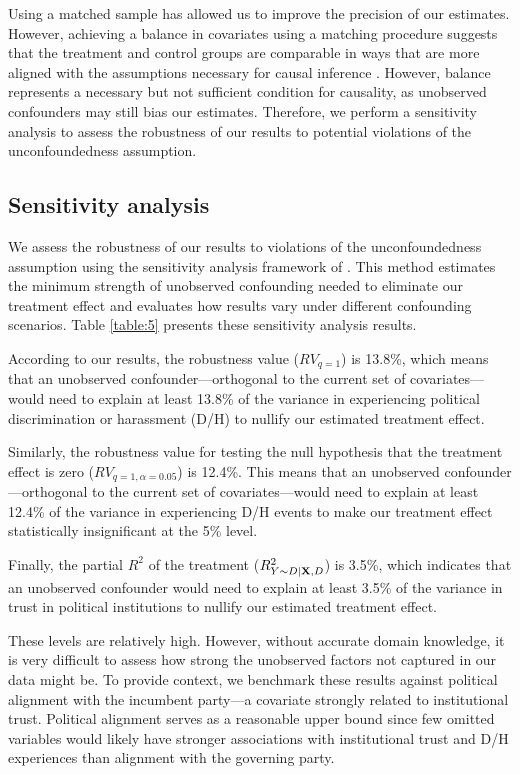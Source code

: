\documentclass{article}
\begin{document}
Using a matched sample has allowed us to improve the precision of our estimates. However, achieving a balance in covariates using a matching procedure suggests that the treatment and control groups are comparable in ways that are more aligned with the assumptions necessary for causal inference \parencite{branson_randomization_2021}. However, balance represents a necessary but not sufficient condition for causality, as unobserved confounders may still bias our estimates. Therefore, we perform a sensitivity analysis to assess the robustness of our results to potential violations of the unconfoundedness assumption.

\subsection{Sensitivity analysis}

We assess the robustness of our results to violations of the unconfoundedness assumption using the sensitivity analysis framework of \textcite{cinelli_making_2020}. This method estimates the minimum strength of unobserved confounding needed to eliminate our treatment effect and evaluates how results vary under different confounding scenarios. Table \ref{table:5} presents these sensitivity analysis results.

According to our results, the robustness value ($RV_{q = 1}$) is 13.8\%, which means that an unobserved confounder—orthogonal to the current set of covariates—would need to explain at least 13.8\% of the variance in experiencing political discrimination or harassment (D/H) to nullify our estimated treatment effect.

Similarly, the robustness value for testing the null hypothesis that the treatment effect is zero ($RV_{q = 1, \alpha = 0.05}$) is 12.4\%. This means that an unobserved confounder—orthogonal to the current set of covariates—would need to explain at least 12.4\% of the variance in experiencing D/H events to make our treatment effect statistically insignificant at the 5\% level.

Finally, the partial $R^2$ of the treatment ($R^2_{Y\sim D| {\bf X}, D}$) is 3.5\%, which indicates that an unobserved confounder would need to explain at least 3.5\% of the variance in trust in political institutions to nullify our estimated treatment effect.

These levels are relatively high. However, without accurate domain knowledge, it is very difficult to assess how strong the unobserved factors not captured in our data might be. To provide context, we benchmark these results against political alignment with the incumbent party—a covariate strongly related to institutional trust. Political alignment serves as a reasonable upper bound since few omitted variables would likely have stronger associations with institutional trust and D/H experiences than alignment with the governing party.
\end{document}
